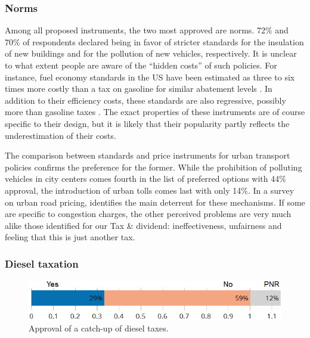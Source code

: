 \documentclass[english,5p,authoryear]{elsarticle}
\begin{document}

        \subsubsection{Norms}

Among all proposed instruments, the two most approved are norms. 72\% and 70\% of respondents declared being in favor of stricter standards for the insulation of new buildings and for the pollution of new vehicles, respectively. It is unclear to what extent people are aware of the ``hidden costs'' of such policies. For instance, fuel economy standards in the US have been estimated as three to six times more costly than a tax on gasoline for similar abatement levels \citep{jacobsen_2013}. In addition to their efficiency costs, these standards are also regressive, possibly more than gasoline taxes \citep{jacobsen_2013, davis_knittel_2019, levinson_2019}. The exact properties of these instruments are of course specific to their design, but it is likely that their popularity partly reflects the underestimation of their costs.

The comparison between standards and price instruments for urban transport policies confirms the preference for the former. While the prohibition of polluting vehicles in city centers comes fourth in the list of preferred options with 44\% approval, the introduction of urban tolls comes last with only 14\%. In a survey on urban road pricing, \citet{jones_1998} identifies the main deterrent for these mechanisms. If some are specific to congestion charges, the other perceived problems are very much alike those identified for our Tax \& dividend: ineffectiveness, unfairness and feeling that this is just another tax.

        \subsubsection{Diesel taxation}

\begin{figure}[b]
\centering
\includegraphics[width=0.9\columnwidth]{Images/diesel_catch_up_trim.png}
\caption{Approval of a catch-up of diesel taxes.}
\label{fig:diesel}
\end{figure}
\end{document}
